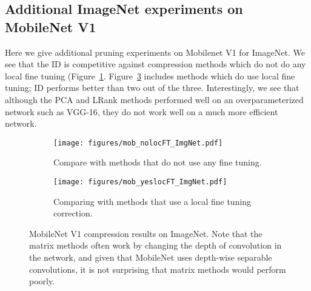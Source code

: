 


\subsection{Additional ImageNet experiments on MobileNet V1}
\label{app:sec:imgnet_extra}
Here we give additional pruning experiments on Mobilenet V1 for ImageNet.
We see that the ID is competitive against compression methods which do not do any local fine tuning (Figure~\ref{fig:mobilenetImgNet_nolocFT}.
Figure~\ref{fig:mobilenetImgNet_yeslocFT} includes methods which do use local fine tuning; ID performs better than two out of the three.
Interestingly, we see that although the PCA and LRank methods performed well on an overparameterized network such as VGG-16, they do not work well on a much more efficient network.

\begin{figure}
\centering
\begin{subfigure}{.45\textwidth}
\centering
\texttt{[image: figures/mob\_nolocFT\_ImgNet.pdf]}
\caption{Compare with methods that do not use any fine tuning.
}
\label{fig:mobilenetImgNet_nolocFT}
\end{subfigure}
\begin{subfigure}{0.45\textwidth}
\centering
\texttt{[image: figures/mob\_yeslocFT\_ImgNet.pdf]}
\caption{Comparing with methods that use a local fine tuning correction.  
}
\label{fig:mobilenetImgNet_yeslocFT}
\end{subfigure}
\centering
\caption{MobileNet V1 compression results on ImageNet. Note that the matrix methods often work by changing the depth of convolution in the network, and given that MobileNet uses depth-wise separable convolutions, it is not surprising that matrix methods would perform poorly.  }
\end{figure}


